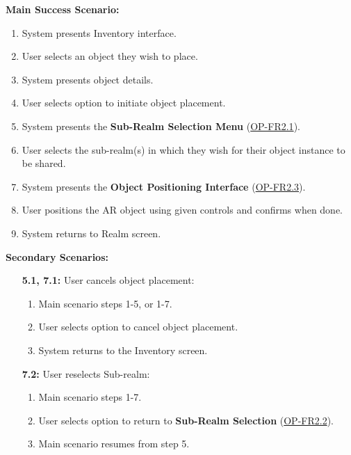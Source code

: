 \documentclass{article}
\begin{document}
\begin{enumerate}[label=\textbf{UC\arabic*}]
        \textbf{Main Success Scenario:}
        \begin{enumerate}[label=\textbf{\arabic*.}]
            \item System presents Inventory interface.
            \item User selects an object they wish to place.
            \item System presents object details.
            \item User selects option to initiate object placement.
            \item System presents the \textbf{Sub-Realm Selection Menu} (\hyperref[ssub:object_placement]{OP-FR2.1}).
            \item User selects the sub-realm(s) in which they wish for their object instance to be shared.
            \item System presents the \textbf{Object Positioning Interface} (\hyperref[ssub:object_placement]{OP-FR2.3}).
            \item User positions the AR object using given controls and confirms when done.
            \item System returns to Realm screen.
        \end{enumerate}
    
        \textbf{Secondary Scenarios:}
        \begin{itemize}
            \item[{\bf 5.1, 7.1:}] User cancels object placement:
            \begin{enumerate}[label=\textbf{\arabic*.}]
                \item Main scenario steps 1-5, or 1-7.
                \item User selects option to cancel object placement.
                \item System returns to the Inventory screen.
            \end{enumerate}
    
            \item[{\bf 7.2:}] User reselects Sub-realm:
            \begin{enumerate}[label=\textbf{\arabic*.}]
                \item Main scenario steps 1-7.
                \item User selects option to return to \textbf{Sub-Realm Selection} (\hyperref[ssub:object_placement]{OP-FR2.2}).
                \item Main scenario resumes from step 5.
            \end{enumerate}
        \end{itemize}
    

\end{enumerate}
\end{document}
